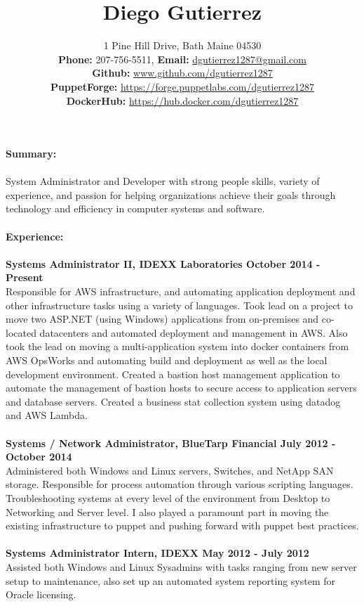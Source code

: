 \documentclass[10pt]{article}
\title{Diego Gutierrez}
\date{}
\author{%
	1 Pine Hill Drive, Bath Maine 04530\\
	\textbf{Phone:} 207-756-5511, \textbf{Email:} \underline{dgutierrez1287@gmail.com}\\
	\textbf{Github:} \tab\underline{www.github.com/dgutierrez1287}\\
	\textbf{PuppetForge:} \underline{https://forge.puppetlabs.com/dgutierrez1287}\\
	\textbf{DockerHub:} \space\space\underline{https://hub.docker.com/dgutierrez1287}
}
\makeatletter
\renewcommand{\maketitle}{\bgroup\setlength{\parindent}{0pt}
	\begin{flushleft}
		\LARGE\textbf{\@title}
		
		\normalsize\@author
	\end{flushleft}\egroup
}
\makeatother
\begin{document}
\maketitle
\thispagestyle{empty} %
\noindent\Large\textbf{Summary:}\\
\\
\normalsize System Administrator and Developer with strong people skills, variety of experience, and passion for helping organizations achieve their goals through technology and efficiency in computer systems and software.
\\
\\
\noindent\Large\textbf{Experience:}\\
\\
\normalsize
\textbf{Systems Administrator II, IDEXX Laboratories \hfill{October 2014 - Present}}\\
\normalsize Responsible for AWS infrastructure, and automating application deployment and other infrastructure tasks using a variety of languages. Took lead on a project to move two ASP.NET (using Windows) applications
from on-premises and co-located datacenters and automated deployment and management in AWS. Also took the lead on moving a multi-application system into docker containers from AWS OpsWorks and automating 
build and deployment as well as the local development environment. Created a bastion host management application to automate the management of bastion hosts to secure access to application servers and database servers.
Created a business stat collection system using datadog and AWS Lambda.
\\
\\
\textbf{Systems / Network Administrator, BlueTarp Financial \hfill{July 2012 - October 2014}}\\
\normalsize Administered both Windows and Linux servers, Switches, and NetApp SAN storage. Responsible for process automation through various scripting languages. Troubleshooting systems at every level of the
environment from Desktop to Networking and Server level. I also played a paramount part in moving the existing infrastructure to puppet and pushing forward with puppet best practices.
\\
\\
\textbf{Systems Administrator Intern, IDEXX \hfill{May 2012 - July 2012}}\\
\normalsize Assisted both Windows and Linux Sysadmins with tasks ranging from new server setup to maintenance, also set up an automated system reporting system for Oracle licensing.
\end{document}
